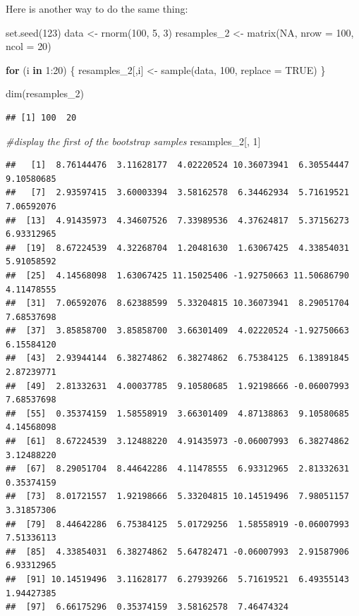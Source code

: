 \documentclass[
]{book}
\newenvironment{Shaded}{\begin{snugshade}}{\end{snugshade}}
\newcommand{\AttributeTok}[1]{\textcolor[rgb]{0.77,0.63,0.00}{#1}}
\newcommand{\CommentTok}[1]{\textcolor[rgb]{0.56,0.35,0.01}{\textit{#1}}}
\newcommand{\ConstantTok}[1]{\textcolor[rgb]{0.00,0.00,0.00}{#1}}
\newcommand{\ControlFlowTok}[1]{\textcolor[rgb]{0.13,0.29,0.53}{\textbf{#1}}}
\newcommand{\DecValTok}[1]{\textcolor[rgb]{0.00,0.00,0.81}{#1}}
\newcommand{\FunctionTok}[1]{\textcolor[rgb]{0.00,0.00,0.00}{#1}}
\newcommand{\NormalTok}[1]{#1}
\newcommand{\OtherTok}[1]{\textcolor[rgb]{0.56,0.35,0.01}{#1}}
\newcommand{\SpecialCharTok}[1]{\textcolor[rgb]{0.00,0.00,0.00}{#1}}
\begin{document}
Here is another way to do the same thing:

\begin{Shaded}
\begin{Highlighting}[]
\FunctionTok{set.seed}\NormalTok{(}\DecValTok{123}\NormalTok{)}
\NormalTok{data }\OtherTok{\textless{}{-}} \FunctionTok{rnorm}\NormalTok{(}\DecValTok{100}\NormalTok{, }\DecValTok{5}\NormalTok{, }\DecValTok{3}\NormalTok{)}
\NormalTok{resamples\_2 }\OtherTok{\textless{}{-}} \FunctionTok{matrix}\NormalTok{(}\ConstantTok{NA}\NormalTok{, }\AttributeTok{nrow =} \DecValTok{100}\NormalTok{, }\AttributeTok{ncol =} \DecValTok{20}\NormalTok{)}

\ControlFlowTok{for}\NormalTok{ (i }\ControlFlowTok{in} \DecValTok{1}\SpecialCharTok{:}\DecValTok{20}\NormalTok{) \{}
\NormalTok{  resamples\_2[,i] }\OtherTok{\textless{}{-}} \FunctionTok{sample}\NormalTok{(data, }\DecValTok{100}\NormalTok{, }\AttributeTok{replace =} \ConstantTok{TRUE}\NormalTok{)}
\NormalTok{\}}

\FunctionTok{dim}\NormalTok{(resamples\_2)}
\end{Highlighting}
\end{Shaded}

\begin{verbatim}
## [1] 100  20
\end{verbatim}

\begin{Shaded}
\begin{Highlighting}[]
\CommentTok{\#display the first of the bootstrap samples}
\NormalTok{resamples\_2[, }\DecValTok{1}\NormalTok{]}
\end{Highlighting}
\end{Shaded}

\begin{verbatim}
##   [1]  8.76144476  3.11628177  4.02220524 10.36073941  6.30554447  9.10580685
##   [7]  2.93597415  3.60003394  3.58162578  6.34462934  5.71619521  7.06592076
##  [13]  4.91435973  4.34607526  7.33989536  4.37624817  5.37156273  6.93312965
##  [19]  8.67224539  4.32268704  1.20481630  1.63067425  4.33854031  5.91058592
##  [25]  4.14568098  1.63067425 11.15025406 -1.92750663 11.50686790  4.11478555
##  [31]  7.06592076  8.62388599  5.33204815 10.36073941  8.29051704  7.68537698
##  [37]  3.85858700  3.85858700  3.66301409  4.02220524 -1.92750663  6.15584120
##  [43]  2.93944144  6.38274862  6.38274862  6.75384125  6.13891845  2.87239771
##  [49]  2.81332631  4.00037785  9.10580685  1.92198666 -0.06007993  7.68537698
##  [55]  0.35374159  1.58558919  3.66301409  4.87138863  9.10580685  4.14568098
##  [61]  8.67224539  3.12488220  4.91435973 -0.06007993  6.38274862  3.12488220
##  [67]  8.29051704  8.44642286  4.11478555  6.93312965  2.81332631  0.35374159
##  [73]  8.01721557  1.92198666  5.33204815 10.14519496  7.98051157  3.31857306
##  [79]  8.44642286  6.75384125  5.01729256  1.58558919 -0.06007993  7.51336113
##  [85]  4.33854031  6.38274862  5.64782471 -0.06007993  2.91587906  6.93312965
##  [91] 10.14519496  3.11628177  6.27939266  5.71619521  6.49355143  1.94427385
##  [97]  6.66175296  0.35374159  3.58162578  7.46474324
\end{verbatim}
\end{document}
